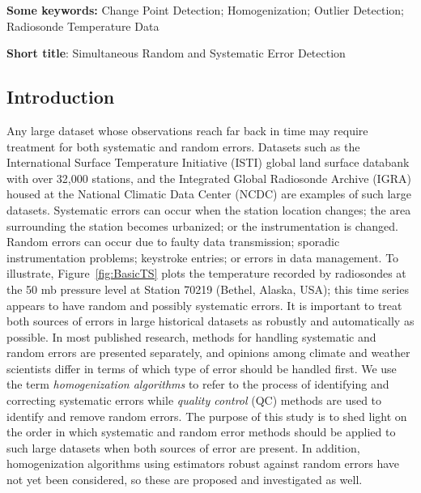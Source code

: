 \documentclass[12pt]{article}
\begin{document}
\begin{singlespacing}
\par\vfill\noindent
{\bf Some keywords:} Change Point Detection; Homogenization; Outlier Detection; Radiosonde Temperature Data

\par\medskip\noindent
{\bf Short title}:  Simultaneous Random and Systematic Error Detection

\end{singlespacing}
\clearpage\pagebreak\newpage {}
\begin{doublespacing}


\section{Introduction}


Any large dataset whose observations reach far back in time may require treatment for both systematic and random errors. Datasets such as the International Surface Temperature Initiative (ISTI) global land surface databank \cite{rennie14} with over 32,000 stations, and the Integrated Global Radiosonde Archive (IGRA) housed at the National Climatic Data Center (NCDC) \cite{durre06} are examples of such large datasets. Systematic errors can occur when the station location changes; the area surrounding the station becomes urbanized; or the instrumentation is changed. Random errors can occur due to faulty data transmission; sporadic instrumentation problems; keystroke entries; or errors in data management. To illustrate, Figure~\ref{fig:BasicTS} plots the temperature recorded by radiosondes at the 50 mb pressure level at Station 70219 (Bethel, Alaska, USA); this time series appears to have random and possibly systematic errors.  It is important to treat both sources of errors in  large historical datasets as robustly and automatically as possible. In most published research, methods for handling systematic and random errors are presented separately, and opinions among climate and weather scientists differ in terms of which type of error should be handled first.  We use the term \emph{homogenization algorithms} to refer to the process of identifying and correcting systematic errors while \emph{quality control} (QC) methods are used to identify and remove random errors.   The purpose of this study is to shed light on the order in which systematic and random error methods should be applied to such large datasets when  both sources of error are present. In addition, homogenization algorithms using estimators robust against random errors have not yet been considered, so these are proposed and investigated as well.


\end{doublespacing}
\end{document}
